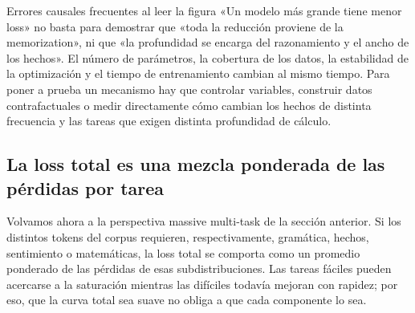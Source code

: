 
\begin{warningbox}{Errores causales frecuentes al leer la figura}
«Un modelo más grande tiene menor loss» no basta para demostrar que «toda la reducción proviene de la memorization», ni que «la profundidad se encarga del razonamiento y el ancho de los hechos». El número de parámetros, la cobertura de los datos, la estabilidad de la optimización y el tiempo de entrenamiento cambian al mismo tiempo. Para poner a prueba un mecanismo hay que controlar variables, construir datos contrafactuales o medir directamente cómo cambian los hechos de distinta frecuencia y las tareas que exigen distinta profundidad de cálculo.
\end{warningbox}


\subsection{La loss total es una mezcla ponderada de las pérdidas por tarea}

Volvamos ahora a la perspectiva massive multi-task de la sección anterior. Si los distintos tokens del corpus requieren, respectivamente, gramática, hechos, sentimiento o matemáticas, la loss total se comporta como un promedio ponderado de las pérdidas de esas subdistribuciones. Las tareas fáciles pueden acercarse a la saturación mientras las difíciles todavía mejoran con rapidez; por eso, que la curva total sea suave no obliga a que cada componente lo sea.



